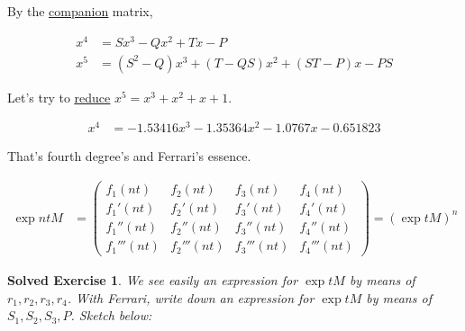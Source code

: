 \documentclass[12pt,a4paper]{article}
\newtheorem*{solved}{Solved Exercise}
\begin{document}
By the \href{https://www.wolframalpha.com/input/?i=\%7B\%7B0,+1,+0,+0\%7D,+\%7B0,+0,+1,+0\%7D,+\%7B0,+0,+0,+1\%7D,+\%7B-P,+T,+-Q,+S\%7D\%7D\%5E4}{\color{blue}\underline{companion}} matrix,

\begin{align}
x^4 &= Sx^3 - Qx^2 + Tx - P  \\
x^5 &= (S^2 - Q)x^3 + (T - QS)x^2 + (ST - P)x - PS
\end{align}

Let's try to \href{https://www.wolframalpha.com/input/?i=1+\%3D+S\%5E2+-+Q+;+1+\%3D+T+-+Q*S+;+1+\%3D+S*T+-+P+;+1+\%3D+-+P*S }{\color{blue}\underline{reduce}} $x^5 = x^3 + x^2 + x + 1$.

\begin{align}
x^4 &= - 1.53416 x^3 - 1.35364 x^2 - 1.0767 x - 0.651823
\end{align}

That's fourth degree's and Ferrari's essence.

\begin{align}
  \exp ntM &= \left(\begin{matrix}f_1(nt) & f_2(nt) & f_3(nt) & f_4(nt) \\ f_1'(nt) & f_2'(nt) & f_3'(nt) & f_4'(nt) \\ f_1''(nt) & f_2''(nt) & f_3''(nt) & f_4''(nt) \\ f_1'''(nt) & f_2'''(nt) & f_3'''(nt) & f_4'''(nt) \end{matrix}\right) = (\exp tM)^n
\end{align}

\begin{solved}
We see easily an expression for $\exp tM$ by means of $r_1, r_2, r_3, r_4$. With Ferrari, write down an expression for $\exp tM$ by means of $S_1, S_2, S_3, P$. Sketch below:
\end{solved}

\footnotesize
\end{document}

